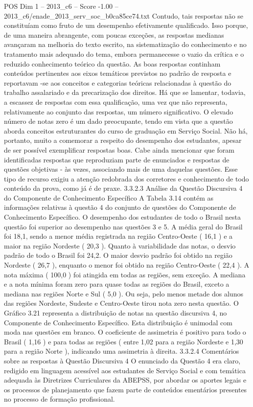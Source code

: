\begin{textsample}{POS Dim 1 – 2013\_c6 – Score -1.00 – 2013\_c6/enade\_2013\_serv\_soc\_b0ca85ce74.txt}
Contudo, tais respostas não se constituíam como fruto de um desempenho efetivamente qualificado.
Isso porque, de uma maneira abrangente, com poucas exceções, as respostas medianas avançaram na melhoria do texto escrito, na sistematização do conhecimento e no tratamento mais adequado do tema, embora permanecesse o vazio da crítica e o reduzido conhecimento teórico da questão.
As boas respostas continham conteúdos pertinentes aos eixos temáticos previstos no padrão de resposta e reportavam -se aos conceitos e categorias teóricas relacionadas à questão do trabalho assalariado e da precarização dos direitos.
Há que se lamentar, todavia, a escassez de respostas com essa qualificação, uma vez que não representa, relativamente ao conjunto das respostas, um número significativo.
O elevado número de notas zero é um dado preocupante, tendo em vista que a questão aborda conceitos estruturantes do curso de graduação em Serviço Social.
Não há, portanto, muito a comemorar a respeito do desempenho dos estudantes, apesar de ser possível exemplificar respostas boas.
Cabe ainda mencionar que foram identificadas respostas que reproduziam parte de enunciados e respostas de questões objetivas - às vezes, associando mais de uma daquelas questões.
Esse tipo de recurso exigiu a atenção redobrada dos corretores e conhecimento de todo conteúdo da prova, como já é de praxe. 3.3.2.3 Análise da Questão Discursiva 4 do Componente de Conhecimento Específico A Tabela 3.14 contém as informações relativas à questão 4 do conjunto de questões do Componente de Conhecimento Específico.
O desempenho dos estudantes de todo o Brasil nesta questão foi superior ao desempenho nas questões 3 e 5.
A média geral do Brasil foi 18,1, sendo a menor média registrada na região Centro-Oeste ( 16,1 ) e a maior na região Nordeste ( 20,3 ).
Quanto à variabilidade das notas, o desvio padrão de todo o Brasil foi 24,2.
O maior desvio padrão foi obtido na região Nordeste ( 26,7 ), enquanto o menor foi obtido na região Centro-Oeste ( 22,4 ).
A nota máxima ( 100,0 ) foi atingida em todas as regiões, sem exceção.
A mediana e a nota mínima foram zero para quase todas as regiões do Brasil, exceto a mediana nas regiões Norte e Sul ( 5,0 ).
Ou seja, pelo menos metade dos alunos das regiões Nordeste, Sudeste e Centro-Oeste tirou nota zero nesta questão.
O Gráfico 3.21 representa a distribuição de notas na questão discursiva 4, no Componente de Conhecimento Específico.
Esta distribuição é unimodal com moda nas questões em branco.
O coeficiente de assimetria é positivo para todo o Brasil ( 1,16 ) e para todas as regiões ( entre 1,02 para a região Nordeste e 1,30 para a região Norte ), indicando uma assimetria à direita. 3.3.2.4 Comentários sobre as respostas à Questão Discursiva 4 O enunciado da Questão 4 era claro, redigido em linguagem acessível aos estudantes de Serviço Social e com temática adequada às Diretrizes Curriculares da ABEPSS, por abordar os aportes legais e os processos de planejamento que fazem parte de conteúdos ementários presentes no processo de formação profissional.

\end{textsample}
